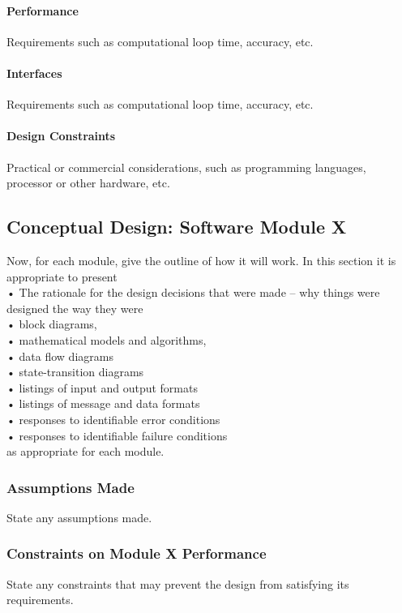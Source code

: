 \documentclass[MTRX3700report.tex]{subfiles}
\begin{document}
\paragraph{Performance}
Requirements such as computational loop time, accuracy, etc.
\paragraph{Interfaces}
Requirements such as computational loop time, accuracy, etc.
\paragraph{Design Constraints}
Practical or commercial considerations, such as programming languages, processor or other hardware, etc.

\subsection{Conceptual Design: Software Module X}
Now, for each module, give the outline of how it will work. In this section it is appropriate to present \\
•	The rationale for the design decisions that were made – why things were designed the way they were\\
•	block diagrams,\\
•	mathematical models and algorithms,\\
•	data flow diagrams\\
•	state-transition diagrams\\
•	listings of input and output formats\\
•	listings of message and data formats\\
•	responses to identifiable error conditions\\
•	responses to identifiable failure conditions\\
as appropriate for each module.

\subsubsection{Assumptions Made}
State any assumptions made.
\subsubsection{Constraints on Module X Performance}
State any constraints that may prevent the design from satisfying its requirements.
\end{document}
